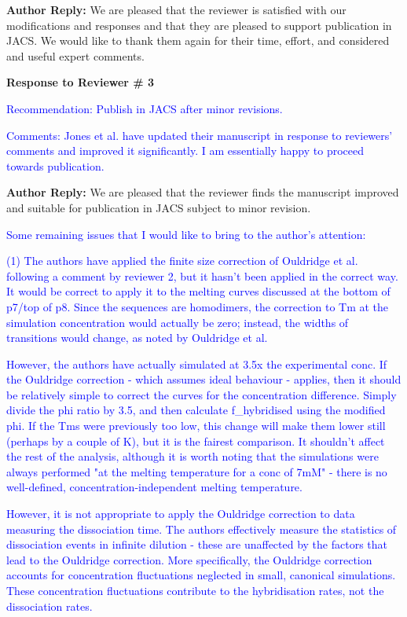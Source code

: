 \documentclass[11pt,a4paper]{letter} %
\begin{document}
\textbf{Author Reply:} We are pleased that the reviewer is satisfied with our modifications and responses and that they are pleased to support publication in JACS. We would like to thank them again for their time, effort, and considered and useful expert comments.




\begin{shaded}
\textbf{Response to Reviewer \# 3}
\end{shaded}

\textcolor{blue}{Recommendation: Publish in JACS after minor revisions.
}

\textcolor{blue}{Comments: Jones et al. have updated their manuscript in response to reviewers' comments and improved it significantly. I am essentially happy to proceed towards publication.
}

\textbf{Author Reply:} We are pleased that the reviewer finds the manuscript improved and suitable for publication in JACS subject to minor revision.

\textcolor{blue}{
Some remaining issues that I would like to bring to the author's attention:
}

\textcolor{blue}{
(1) The authors have applied the finite size correction of Ouldridge et al. following a comment by reviewer 2, but it hasn't been applied in the correct way. It would be correct to apply it to the melting curves discussed at the bottom of p7/top of p8. Since the sequences are homodimers, the correction to Tm at the simulation concentration would actually be zero; instead, the widths of transitions would change, as noted by Ouldridge et al.
}

\textcolor{blue}{
However, the authors have actually simulated at 3.5x the experimental conc. If the Ouldridge correction - which assumes ideal behaviour - applies, then it should be relatively simple to correct the curves for the concentration difference. Simply divide the phi ratio by 3.5, and then calculate f\_hybridised using the modified phi. If the Tms were previously too low, this change will make them lower still (perhaps by a couple of K), but it is the fairest comparison. It shouldn't affect the rest of the analysis, although it is worth noting that the simulations were always performed "at the melting temperature for a conc of 7mM" - there is no well-defined, concentration-independent melting temperature.
}

\textcolor{blue}{
However, it is not appropriate to apply the Ouldridge correction to data measuring the dissociation time. The authors effectively measure the statistics of dissociation events in infinite dilution - these are unaffected by the factors that lead to the Ouldridge correction. More specifically, the Ouldridge correction accounts for concentration fluctuations neglected in small, canonical simulations. These concentration fluctuations contribute to the hybridisation rates, not the dissociation rates.
}
\end{document}
